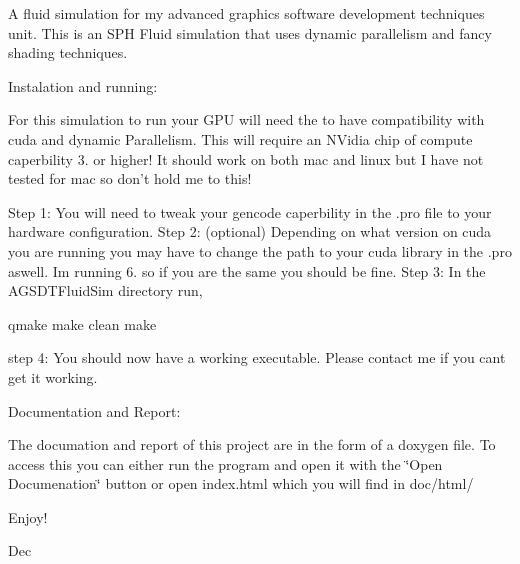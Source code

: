 A fluid simulation for my advanced graphics software development techniques unit. This is an S\-P\-H Fluid simulation that uses dynamic parallelism and fancy shading techniques.

Instalation and running\-:

For this simulation to run your G\-P\-U will need the to have compatibility with cuda and dynamic Parallelism. This will require an N\-Vidia chip of compute caperbility 3. or higher! It should work on both mac and linux but I have not tested for mac so don't hold me to this!

Step 1\-: You will need to tweak your gencode caperbility in the .pro file to your hardware configuration. Step 2\-: (optional) Depending on what version on cuda you are running you may have to change the path to your cuda library in the .pro aswell. Im running 6. so if you are the same you should be fine. Step 3\-: In the A\-G\-S\-D\-T\-Fluid\-Sim directory run, \begin{DoxyVerb}qmake
make clean
make
\end{DoxyVerb}


step 4\-: You should now have a working executable. Please contact me if you cant get it working.

Documentation and Report\-:

The documation and report of this project are in the form of a doxygen file. To access this you can either run the program and open it with the \char`\"{}\-Open Documenation\char`\"{} button or open index.\-html which you will find in doc/html/

Enjoy!

Dec 